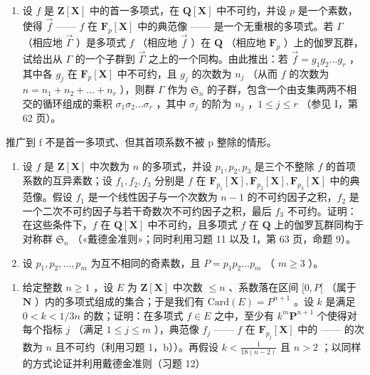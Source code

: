 \begin{enumerate}
\def\labelenumi{\arabic{enumi})}
\setcounter{enumi}{10}
\tightlist
\item
  设 \(f\) 是 \(\mathbf{Z}[\mathbf{X}]\) 中的首一多项式，在 \(\mathbf{Q}[\mathbf{X}]\) 中不可约，并设 \(p\) 是一个素数，使得 \(\vec{f}\) —— \(f\) 在 \(\mathbf{F}_p[\mathbf{X}]\) 中的典范像 —— 是一个无重根的多项式。若 \(\Gamma\) （相应地 \(\vec{\Gamma}\) ）是多项式 \(f\) （相应地 \(\vec{f}\) ）在 \(\mathbf{Q}\) （相应地 \(\mathbf{F}_p\) ）上的伽罗瓦群，试给出从 \(\Gamma\) 的一个子群到 \(\vec{\Gamma}\) 之上的一个同构。由此推出：若 \(\vec{f} = g_1g_2\ldots g_r\) ，其中各 \(g_j\) 在 \(\mathbf{F}_p[\mathbf{X}]\) 中不可约，且 \(g_j\) 的次数为 \(n_j\) （从而 \(f\) 的次数为 \(n = n_1 + n_2 + \dots + n_r\) ），则群 \(\Gamma\) 作为 \(\mathfrak{S}_n\) 的子群，包含一个由支集两两不相交的循环组成的乘积 \(\sigma_1\sigma_2\ldots\sigma_r\) ，其中 \(\sigma_j\) 的阶为 \(n_j\) ，\(1\leqslant j\leqslant r\) （参见 I，第 62 页）。
\end{enumerate}

推广到 f 不是首一多项式、但其首项系数不被 p 整除的情形。

\begin{enumerate}
\def\labelenumi{\arabic{enumi})}
\setcounter{enumi}{11}
\item
  设 \(f\) 是 \(\mathbf{Z}[\mathbf{X}]\) 中次数为 \(n\) 的多项式，并设 \(p_1, p_2, p_3\) 是三个不整除 \(f\) 的首项系数的互异素数；设 \(f_1, f_2, f_3\) 分别是 \(f\) 在 \(\mathbf{F}_{p_1}[\mathbf{X}], \mathbf{F}_{p_2}[\mathbf{X}], \mathbf{F}_{p_3}[\mathbf{X}]\) 中的典范像。假设 \(f_1\) 是一个线性因子与一个次数为 \(n - 1\) 的不可约因子之积，\(f_2\) 是一个二次不可约因子与若干奇数次不可约因子之积，最后 \(f_3\) 不可约。证明：在这些条件下，\(f\) 在 \(\mathbf{Q}[\mathbf{X}]\) 中不可约，且多项式 \(f\) 在 \(\mathbf{Q}\) 上的伽罗瓦群同构于对称群 \(\mathfrak{S}_n\) （«戴德金准则»；同时利用习题 11 以及 I，第 63 页，命题 9）。
\item
  设 \(p_1, p_2, \ldots, p_m\) 为互不相同的奇素数，且 \(P = p_1p_2 \ldots p_m\) （ \(m \geqslant 3\) ）。
\end{enumerate}

\begin{enumerate}
\def\labelenumi{\alph{enumi})}
\tightlist
\item
  给定整数 \(n \geqslant 1\) ，设 \(E\) 为 \(\mathbf{Z}[\mathbf{X}]\) 中次数 \(\leqslant n\) 、系数落在区间 \([0, P[\) （属于 \(\mathbf{N}\) ）内的多项式组成的集合；于是我们有 \(\text{Card}(E) = P^{n+1}\) 。设 \(k\) 是满足 \(0 < k < 1/3n\) 的数；证明：在多项式 \(f \in E\) 之中，至少有 \(k^m\mathbf{P}^{n + 1}\) 个使得对每个指标 \(j\) （满足 \(1 \leqslant j \leqslant m\) ），典范像 \(f_j\) —— \(f\) 在 \(\mathbf{F}_{p_j}[\mathbf{X}]\) 中的 —— 的次数为 \(n\) 且不可约（利用习题 1，b））。再假设 \(k < \frac{1}{18(n - 2)}\) 且 \(n > 2\) ；以同样的方式论证并利用戴德金准则（习题 12）
\end{enumerate}

